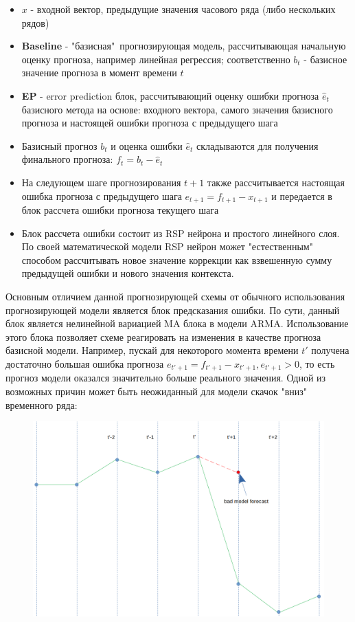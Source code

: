 \documentclass[11pt]{article}
\begin{document}
\begin{itemize}
\item $x$ - входной вектор, предыдущие значения часового ряда (либо нескольких рядов)
\item \textbf{Baseline} - "базисная"\ прогнозирующая модель, рассчитывающая начальную оценку прогноза, например линейная регрессия; соответственно $b_t$ - базисное значение прогноза в момент времени $t$
\item \textbf{EP} - error prediction блок, рассчитывающий оценку ошибки прогноза $\hat{e}_t$ базисного метода на основе: входного вектора, самого значения базисного прогноза и настоящей ошибки прогноза с предыдущего шага
\item Базисный прогноз $b_t$ и оценка ошибки $\hat{e}_t$ складываются для получения финального прогноза: $f_t = b_t - \hat{e}_t$
\item На следующем шаге прогнозирования $t+1$ также рассчитывается настоящая ошибка прогноза с предыдущего шага $e_{t+1} = f_{t+1} - x_{t+1}$ и передается в блок рассчета ошибки прогноза текущего шага
\item Блок рассчета ошибки состоит из RSP нейрона и простого линейного слоя. По своей математической модели RSP нейрон может "естественным" способом рассчитывать новое значение коррекции как взвешенную сумму предыдущей ошибки и нового значения контекста.
\end{itemize}

Основным отличием данной прогнозирующей схемы от обычного использования прогнозирующей модели является блок предсказания ошибки. По сути, данный блок является нелинейной вариацией MA блока в модели ARMA. Использование этого блока позволяет схеме реагировать на изменения в качестве прогноза базисной модели. Например, пускай для некоторого момента времени $t'$ получена достаточно большая ошибка прогноза $ e_{t'+1} = f_{t'+1} - x_{t'+1}, e_{t'+1} > 0 $, то есть прогноз модели оказался значительно больше реального значения. Одной из возможных причин может быть неожиданный для модели скачок "вниз" временного ряда:
\begin{figure}[H]
\centering
\includegraphics[scale=0.25]{bad_model_forecast_too_high_example1_for_dynamic_EC_block.png}
\label{}
\end{figure}
\end{document}
